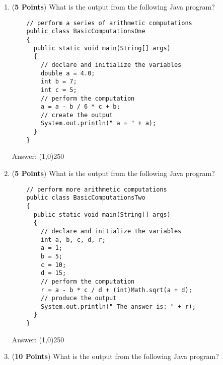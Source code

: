 \documentclass[12pt]{article}
\begin{document}
\begin{enumerate}

  \item ({\bf 5 Points}) What is the output from the following Java program?

\hspace*{.25in}
\begin{minipage}{6in}
  \lstset{numbers=left}
  \begin{lstlisting}
    // perform a series of arithmetic computations
    public class BasicComputationsOne
    {
      public static void main(String[] args)
      {
        // declare and initialize the variables
        double a = 4.0;
        int b = 7;
        int c = 5;
        // perform the computation
        a = a - b / 6 * c + b;
        // create the output
        System.out.println(" a = " + a);
      }
    }
  \end{lstlisting}

\end{minipage}

Answer: \line(1,0){250}

\newpage

\item ({\bf 5 Points}) What is the output from the following Java program?

\hspace*{.25in}
\begin{minipage}{6in}
  \lstset{numbers=left}
  \begin{lstlisting}
    // perform more arithmetic computations
    public class BasicComputationsTwo
    {
      public static void main(String[] args)
      {
        // declare and initialize the variables
        int a, b, c, d, r;
        a = 1;
        b = 5;
        c = 10;
        d = 15;
        // perform the computation
        r = a - b * c / d + (int)Math.sqrt(a + d);
        // produce the output
        System.out.println(" The answer is: " + r);
      }
    }
  \end{lstlisting}

\end{minipage}

Answer: \line(1,0){250}

\newpage

\item ({\bf 10 Points}) What is the output from the following Java program?


\end{enumerate}
\end{document}
